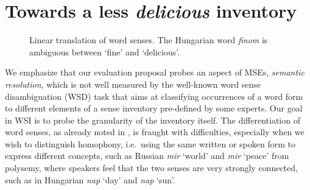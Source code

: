 \documentclass[11pt]{article}
\begin{document}
\section{Towards a less \emph{delicious} inventory}

\label{sec:delicious}

\begin{figure}
    \centering
    \resizebox{\columnwidth}{!} {
    }
    \caption{Linear translation of word senses. The Hungarian word
        \emph{finom} is ambiguous between `fine' and `delicious'.}
        \label{fig:AdaGram}
\end{figure}


We emphasize that our evaluation proposal probes an aspect of MSEs,
\emph{semantic resolution}, which is not well measured by the well-known word
sense disambiguation (WSD) task that aims at classifying occurrences of a word
form to different elements of a sense inventory pre-defined by some experts.
Our goal in WSI is to probe the granularity of the inventory itself.  The
differentiation of word senses, as already noted in \cite{Borbely:2016}, is
fraught with difficulties, especially when we wish to distinguish homophony,
i.e.~using the same written or spoken form to express different concepts, such as
Russian {\it mir} `world' and {\it mir} `peace' from polysemy, where speakers
feel that the two senses are very strongly connected, such as in Hungarian {\it
nap} `day' and {\it nap} `sun'.
\end{document}
